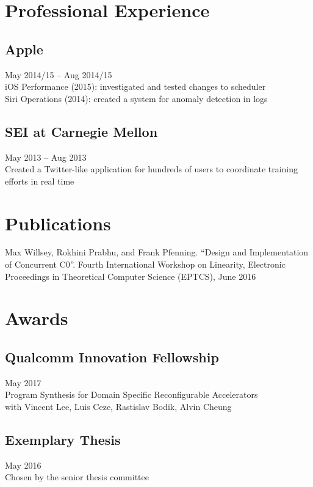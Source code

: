 \documentclass{article}
\begin{document}
\section{Professional Experience}

\subsection{Apple}
\hfill May 2014/15 -- Aug 2014/15 \\
iOS Performance (2015): investigated and tested changes to scheduler \\
Siri Operations (2014): created a system for anomaly detection in logs

\subsection{SEI at Carnegie Mellon}
\hfill May 2013 -- Aug 2013 \\
Created a Twitter-like application for hundreds of users to coordinate training efforts in real time

\section{Publications}

Max Willsey, Rokhini Prabhu, and Frank Pfenning.
``Design and Implementation of Concurrent C0''.
Fourth International Workshop on Linearity, Electronic Proceedings in Theoretical Computer Science (EPTCS), June 2016

\section{Awards}

\subsection{Qualcomm Innovation Fellowship}
\hfill May 2017 \\
Program Synthesis for Domain Specific Reconfigurable Accelerators \\
with Vincent Lee, Luis Ceze, Rastislav Bodik, Alvin Cheung

\subsection{Exemplary Thesis}
\hfill May 2016 \\
Chosen by the senior thesis committee
\end{document}
